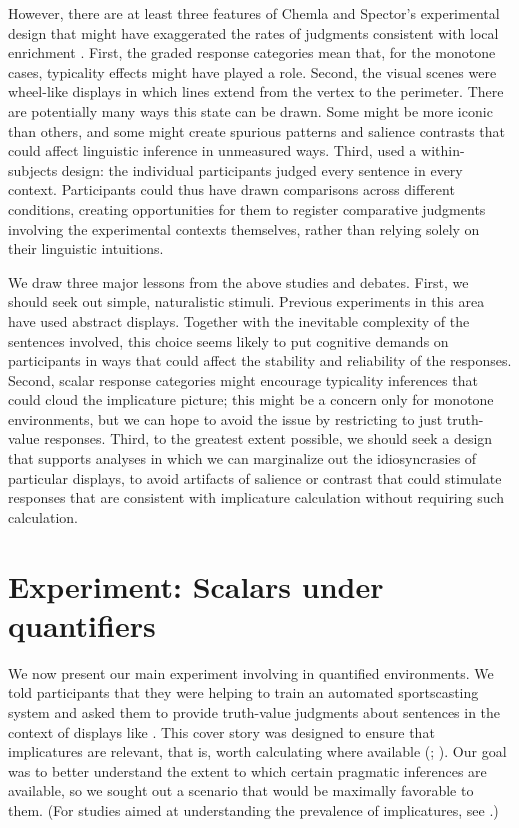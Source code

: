 \documentclass[leqno,12pt]{article}
\begin{document}
However, there are at least three features of Chemla and Spector's experimental design
that might have exaggerated the rates of judgments consistent with
local enrichment \citep{geurts-vantiel:2013:scalar}. First, the graded
response categories mean that, for the monotone cases, typicality
effects might have played a role. Second, the visual scenes were
wheel-like displays in which lines extend from the vertex to the
perimeter. There are potentially many ways this state can be drawn.
Some might be more iconic than others, and some might create spurious
patterns and salience contrasts that could affect linguistic inference
in unmeasured ways. Third, \citeauthor{Chemla:Spector:2011} used a
within-subjects design: the individual participants judged every
sentence in every context. Participants could thus have drawn
comparisons across different conditions, creating opportunities
for them to register comparative judgments involving the experimental
contexts themselves, rather than relying solely on their linguistic
intuitions.

We draw three major lessons from the above studies and debates. First,
we should seek out simple, naturalistic stimuli. Previous experiments
in this area have used abstract displays. Together with the inevitable
complexity of the sentences involved, this choice seems likely to put
cognitive demands on participants in ways that could affect the stability and
reliability of the responses. Second, scalar response categories might
encourage typicality inferences that could cloud the implicature
picture; this might be a concern only for monotone environments, but
we can hope to avoid the issue by restricting to just truth-value
responses. Third, to the greatest extent possible, we should seek a
design that supports analyses in which we can marginalize out the
idiosyncrasies of particular displays, to avoid artifacts of salience
or contrast that could stimulate responses that are consistent with
implicature calculation without requiring such calculation.


\section{Experiment: Scalars under quantifiers}\label{sec:binary}


We now present our main experiment involving  in quantified
environments. We told participants that they were helping to train an
automated sportscasting system and asked them to provide truth-value
judgments about sentences in the context of displays like
. This cover story was designed to ensure
that implicatures are relevant, that is, worth calculating where
available (;
\citealt{Clifton:Dube:2010}). Our goal was to better understand the
extent to which certain pragmatic inferences are available, so we
sought out a scenario that would be maximally favorable to them. (For
studies aimed at understanding the prevalence of implicatures, see
\citealt{Paris:1973,Hendriks-etal:2009,degen:inpress-SP}.)
\end{document}
